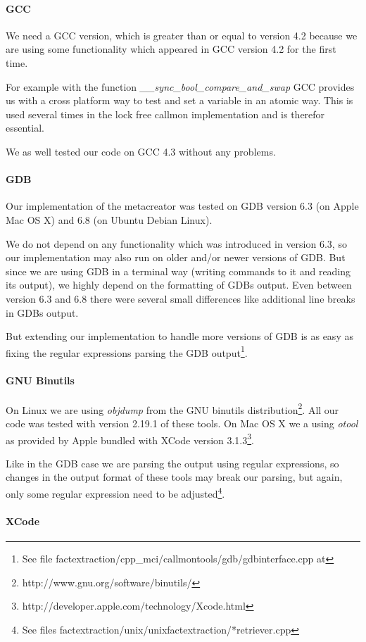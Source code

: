 \paragraph{GCC} We need a GCC version, which is greater than or equal to version 4.2 because we are using some functionality which appeared in GCC version 4.2 for the first time.

For example with the function \emph{\_\_sync\_bool\_compare\_and\_swap} GCC provides us with a cross platform way to test and set a variable in an atomic way. This is used several times in the lock free callmon implementation and is therefor essential.

We as well tested our code on GCC 4.3 without any problems.

\paragraph{GDB}

Our implementation of the metacreator was tested on GDB version 6.3 (on Apple Mac OS X) and 6.8 (on Ubuntu Debian Linux).

We do not depend on any functionality which was introduced in version 6.3, so our implementation may also run on older and/or newer versions of GDB. But since we are using GDB in a terminal way (writing commands to it and reading its output), we highly depend on the formatting of GDBs output. Even between version 6.3 and 6.8 there were several small differences like additional line breaks in GDBs output.

But extending our implementation to handle more versions of GDB is as easy as fixing the regular expressions parsing the GDB output\footnote{See file factextraction/cpp\_mci/callmontools/gdb/gdbinterface.cpp at }.

\paragraph{GNU Binutils}

On Linux we are using \emph{objdump} from the GNU binutils distribution\footnote{http://www.gnu.org/software/binutils/}.
All our code was tested with version 2.19.1 of these tools.  On Mac OS X we a using \emph{otool} as provided by Apple bundled with XCode version 3.1.3\footnote{http://developer.apple.com/technology/Xcode.html}.

Like in the GDB case we are parsing the output using regular expressions, so changes in the output format of these tools may break our parsing, but again, only some regular expression need to be adjusted\footnote{See files factextraction/unix/unixfactextraction/*retriever.cpp}.



\paragraph{XCode} 
